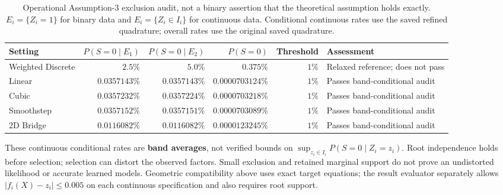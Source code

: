 \documentclass[11pt]{article}
\begin{document}
\begin{table}[h!]
\centering\small\renewcommand{\arraystretch}{1.2}
\begin{tabular}{lrrrrl}
\toprule
Setting & $P(S=0\mid E_1)$ & $P(S=0\mid E_2)$ & $P(S=0)$ & Threshold & Assessment \\
\midrule
Weighted Discrete & $2.5\%$ & $5.0\%$ & $0.375\%$ & $1\%$ & Relaxed reference; does not pass \\
Linear & $0.0357143\%$ & $0.0357143\%$ & $0.0000703124\%$ & $1\%$ & Passes band-conditional audit \\
Cubic & $0.0357232\%$ & $0.0357224\%$ & $0.0000703218\%$ & $1\%$ & Passes band-conditional audit \\
Smoothstep & $0.0357152\%$ & $0.0357151\%$ & $0.0000703089\%$ & $1\%$ & Passes band-conditional audit \\
2D Bridge & $0.0116082\%$ & $0.0116082\%$ & $0.0000123245\%$ & $1\%$ & Passes band-conditional audit \\
\bottomrule
\end{tabular}
\caption{Operational Assumption-3 exclusion audit, not a binary assertion that the theoretical assumption holds exactly. $E_i=\{Z_i=1\}$ for binary data and $E_i=\{Z_i\in I_i\}$ for continuous data. Conditional continuous rates use the saved refined quadrature; overall rates use the original saved quadrature.}
\end{table}
These continuous conditional rates are \textbf{band averages}, not verified bounds on $\sup_{z_i\in I_i}P(S=0\mid Z_i=z_i)$. Root independence holds before selection; selection can distort the observed factors. Small exclusion and retained marginal support do not prove an undistorted likelihood or accurate learned models. Geometric compatibility above uses exact target equations; the result evaluator separately allows $|f_i(X)-z_i|\leq0.005$ on each continuous specification and also requires root support.
\end{document}
